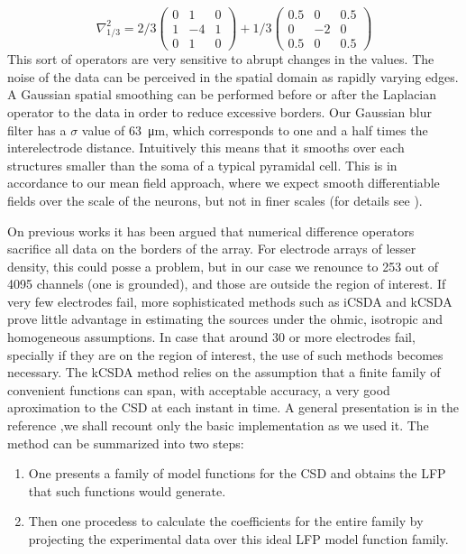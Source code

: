 \documentclass[12pt]{article}
\newcommand{\mum}[1]{\SI{#1}{\micro\metre}}
\begin{document}
\begin{equation}
\nabla^2_{1/3}=2/3
\begin{pmatrix}
  0 & 1 & 0 \\
  1 & -4 & 1 \\
  0 & 1 & 0
\end{pmatrix}
+1/3
\begin{pmatrix}
  0.5 & 0 & 0.5 \\
  0 & -2 & 0 \\
  0.5 & 0 & 0.5
\end{pmatrix}  
\end{equation}
This sort of operators are very sensitive to abrupt changes in the values.
The noise of the data can be perceived in the spatial domain as rapidly varying edges. A Gaussian spatial smoothing
can be performed before or after the Laplacian operator to the data in order to reduce excessive borders. Our Gaussian blur filter has a $ \sigma$ value of \mum{63}, which corresponds to one and a half times the interelectrode distance.
Intuitively this means that it smooths over each structures smaller than the soma of a typical pyramidal cell. 
This is  in accordance to our mean field approach, where we expect smooth differentiable fields over the scale of the neurons, but not in finer scales (for details see \cite{Bedard11}).

On previous works it has been argued that numerical difference operators sacrifice all data on the borders of the array. For electrode arrays of lesser density, this could posse a problem, but in our case we renounce to 253 out of 4095 channels (one is grounded), and those are outside the region of interest.
If very few electrodes fail, more sophisticated methods such as iCSDA \cite{Leski2011} and kCSDA \cite{Potworowski2011} prove little advantage in estimating the sources under the ohmic, isotropic and homogeneous assumptions. In case that around 30 or more electrodes
fail, specially if they are on the region of interest, the use of such methods
becomes necessary. The kCSDA method relies on the
assumption that a finite family of convenient functions can span, with acceptable accuracy, a very good aproximation to the  CSD at each instant in time.
A general presentation is in the reference \cite{Potworowski2011},we shall recount only the basic implementation as we used it. The
method can be summarized into two steps:
\begin{enumerate}
\item One presents a family of model functions for the CSD and
obtains the LFP that such functions
would generate.
\item Then one procedess to calculate
  the coefficients for the entire family by projecting the
  experimental data over this ideal LFP model function family.
\end{enumerate}
\end{document}
